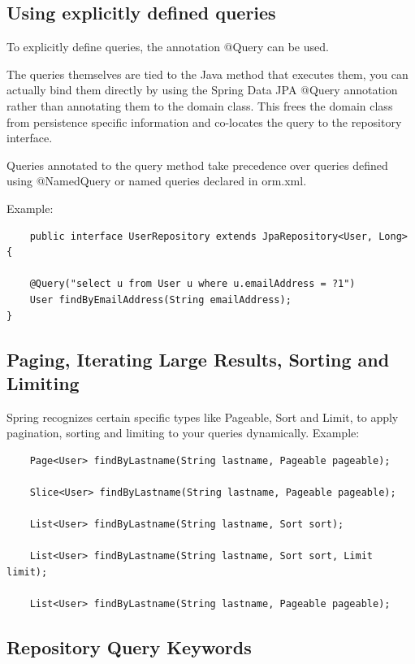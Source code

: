 \documentclass{scrartcl}
\begin{document}
\subsection{Using explicitly defined queries}

To explicitly define queries, the annotation @Query can be used.

The queries themselves are tied to the Java method that executes them, you can actually bind them directly by using the Spring Data JPA @Query annotation rather than annotating them to the domain class. This frees the domain class from persistence specific information and co-locates the query to the repository interface.

Queries annotated to the query method take precedence over queries defined using @NamedQuery or named queries declared in orm.xml.

Example:

\begin{lstlisting}
    public interface UserRepository extends JpaRepository<User, Long> {

    @Query("select u from User u where u.emailAddress = ?1")
    User findByEmailAddress(String emailAddress);
}

\end{lstlisting}


\subsection{Paging, Iterating Large Results, Sorting and Limiting}

    Spring recognizes certain specific types like Pageable, Sort and Limit, to apply pagination, sorting and limiting to your queries dynamically.
    Example:

\begin{lstlisting}
    Page<User> findByLastname(String lastname, Pageable pageable);

    Slice<User> findByLastname(String lastname, Pageable pageable);

    List<User> findByLastname(String lastname, Sort sort);

    List<User> findByLastname(String lastname, Sort sort, Limit limit);

    List<User> findByLastname(String lastname, Pageable pageable);
\end{lstlisting}

\subsection{Repository Query Keywords}
\end{document}
